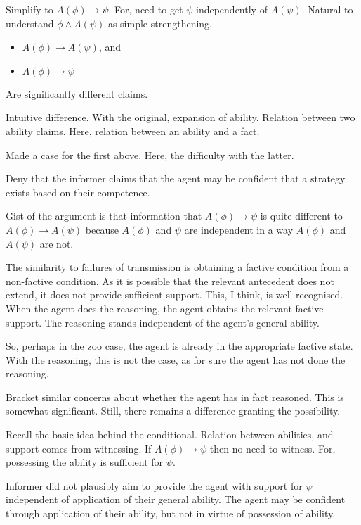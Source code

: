 \documentclass[10pt]{article}
\newcommand{\hozlinedash}[0]{%
  \noindent\hdashrule[0.5ex][c]{\textwidth}{.1pt}{2.5pt}
}
\begin{document}
Simplify to \(A(\phi) \rightarrow \psi\).
For, need to get \(\psi\) independently of \(A(\psi)\).
Natural to understand \(\phi \land A(\psi)\) as simple strengthening.

\begin{itemize}
\item \(A(\phi) \rightarrow A(\psi)\), and
\item \(A(\phi) \rightarrow \psi\)
\end{itemize}
Are significantly different claims.

Intuitive difference.
With the original, expansion of ability.
Relation between two ability claims.
Here, relation between an ability and a fact.

Made a case for the first above.
Here, the difficulty with the latter.

Deny that the informer claims that the agent may be confident that a strategy exists based on their competence.

Gist of the argument is that information that \(A(\phi) \rightarrow \psi\) is quite different to \(A(\phi) \rightarrow A(\psi)\) because \(A(\phi)\) and \(\psi\) are independent in a way \(A(\phi)\) and \(A(\psi)\) are not.

{
  \color{red}
  The similarity to failures of transmission is obtaining a factive condition from a non-factive condition.
  As it is possible that the relevant antecedent does not extend, it does not provide sufficient support.
  This, I think, is well recognised.
  When the agent does the reasoning, the agent obtains the relevant factive support.
  The reasoning stands independent of the agent's general ability.

  So, perhaps in the zoo case, the agent is already in the appropriate factive state.
  With the reasoning, this is not the case, as for sure the agent has not done the reasoning.

  Bracket similar concerns about whether the agent has in fact reasoned.
  This is somewhat significant.
  Still, there remains a difference granting the possibility.
}

\hozlinedash

Recall the basic idea behind the conditional.
Relation between abilities, and support comes from witnessing.
If \(A(\phi) \rightarrow \psi\) then no need to witness.
For, possessing the ability is sufficient for \(\psi\).

Informer did not plausibly aim to provide the agent with support for \(\psi\) independent of application of their general ability.
The agent may be confident through application of their ability, but not in virtue of possession of ability.
\end{document}
